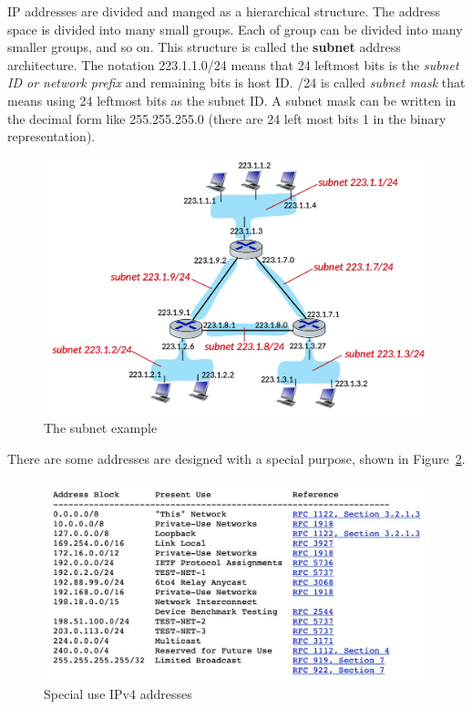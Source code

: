 \documentclass[a4paper, 11pt]{article}
\begin{document}
IP addresses are divided and manged as a hierarchical structure. The address space is divided into many small groups. Each of group can be divided into many smaller groups, and so on. This structure is called the \textbf{subnet} address architecture. The notation 223.1.1.0/24 means that 24 leftmost bits is the \textit{subnet ID or network prefix} and remaining bits is host ID. /24 is called \textit{subnet mask} that means using 24 leftmost bits as the subnet ID. 
A subnet mask can be written in the decimal form like 255.255.255.0 (there are 24 left most bits 1 in the binary representation).\\

\begin{figure}[h]
\includegraphics[scale=0.4]{subnet-example.png}
\caption{The subnet example}
\label{fig:subnet-example}
\end{figure}

There are some addresses are designed with a special purpose, shown in Figure~\ref{fig:special-ip-address}.\\

\begin{figure}[h]
\includegraphics[scale=0.3]{special-ipv4.jpg}
\caption{Special use IPv4 addresses}
\label{fig:special-ip-address}
\end{figure}
\end{document}
